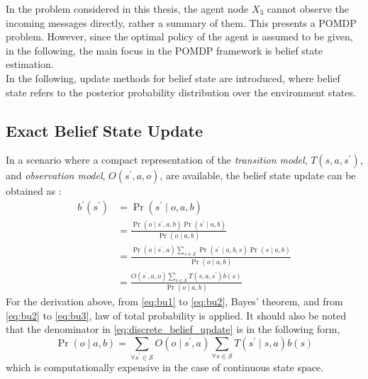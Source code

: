 In the problem considered in this thesis, the agent node $ X_{3} $ cannot observe the incoming messages directly, rather a summary of them. This presents a POMDP problem. However, since the optimal policy of the agent is assumed to be given, in the following, the main focus in the POMDP framework is belief state estimation. \\
In the following, update methods for belief state are introduced, where belief state refers to the posterior probability distribution over the environment states.

\subsection{Exact Belief State Update}
\label{sec:exact_update}
In a scenario where a compact representation of the \textit{transition model}, $ T(s, a, s^{\prime})$,  and \textit{observation model}, $ O(s^{\prime}, a, o) $, are available, the belief state update can be obtained as \cite{KAELBLING199899}:
\begin{align}
b^{\prime}\left(s^{\prime}\right) &=\operatorname{Pr}\left(s^{\prime} \mid o, a, b\right) \label{eq:bu1}\\
&=\frac{\operatorname{Pr}\left(o \mid s^{\prime}, a, b\right) \operatorname{Pr}\left(s^{\prime} \mid a, b\right)}{\operatorname{Pr}(o \mid a, b)} \label{eq:bu2}\\
&=\frac{\operatorname{Pr}\left(o \mid s^{\prime}, a\right) \sum_{s \in \mathcal{S}} \operatorname{Pr}\left(s^{\prime} \mid a, b, s\right) \operatorname{Pr}(s \mid a, b)}{\operatorname{Pr}(o \mid a, b)}  \label{eq:bu3}\\
&=\frac{O\left(s^{\prime}, a, o\right) \sum_{s \in \mathcal{S}} T\left(s,a, s^{\prime}\right) b(s)}{\operatorname{Pr}(o \mid a, b)} 
\label{eq:discrete_belief_update}
\end{align}
For the derivation above, from \autoref{eq:bu1} to \autoref{eq:bu2}, Bayes' theorem, and from \autoref{eq:bu2} to \autoref{eq:bu3}, law of total probability is applied. It should also be noted that the denominator in \autoref{eq:discrete_belief_update} is in the following form, 
\begin{equation}
\operatorname{Pr}(o \mid a, b) = \sum_{\forall s^{\prime} \in \mathcal{S}} O(o \mid s^{\prime}, a) \sum_{\forall s \in \mathcal{S}} T(s^{\prime}\mid s,a) b(s)
\label{eq:nasty_denom}
\end{equation}
which is computationally expensive in the case of continuous state space.
